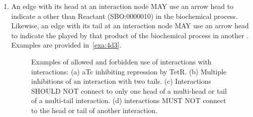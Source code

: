 \begin{enumerate}
\item An edge with its head at an interaction node MAY use an  arrow head to indicate a  other than Reactant (SBO:0000010) in the biochemical process.
	Likewise, an edge with its tail at an interaction node MAY use an  arrow head to indicate the  played by that product of the biochemical process in another .
	Examples are provided in~\ref{exa:4d3}.

	\begin{figure}[h!]
	\centering
	\hspace{1.0cm}
	\hspace{1.0cm}
	\caption{Examples of allowed and forbidden use of interactions with interactions: 
	(a) aTc inhibiting repression by TetR.
	(b) Multiple inhibitions of an interaction with two tails.
	(c) Interactions SHOULD NOT connect to only one head of a multi-head or tail of a multi-tail interaction.
	(d) interactions MUST NOT connect to the head or tail of another interaction.}
	\label{exa:4e}
	\end{figure}


\end{enumerate}
